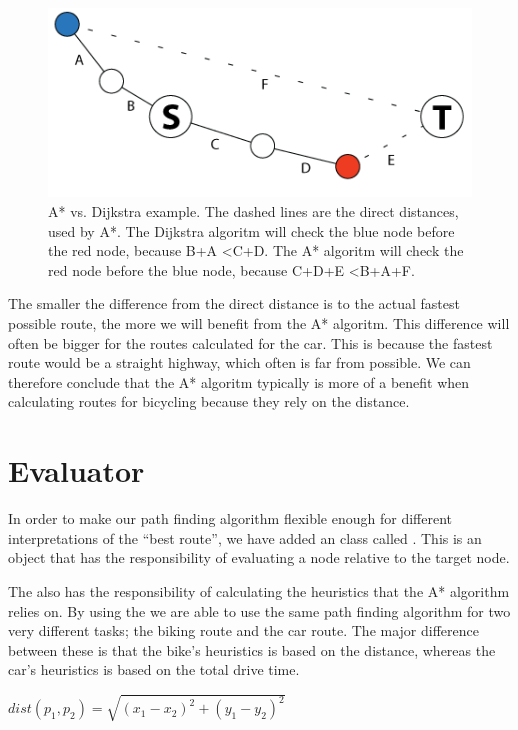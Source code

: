 \begin{figure}[!ht]
\centering
\includegraphics[width=1\linewidth]{images/AstarVSDijkstra.png}
\caption{A* vs. Dijkstra example. The dashed lines are the direct distances,
used by A*. The Dijkstra algoritm will check the blue node before the red
node, because B+A \textless C+D. The A* algoritm will check the red node
before the blue node, because C+D+E \textless B+A+F.}
\label{ad}
\end{figure}

The smaller the difference from the direct distance is to the actual fastest
possible route, the more we will benefit from the A* algoritm. This
difference will often be bigger for the routes calculated for the car. This is
because the fastest route would be a straight highway, which often is far from
possible. We can therefore conclude that the A* algoritm typically is more
of a benefit when calculating routes for bicycling because they rely on the
distance.

\section{Evaluator}
\label{IMPL-EVA}
In order to make our path finding algorithm flexible enough for different 
interpretations of the ``best route'', we have added an class called
. This is an object that has the responsibility of evaluating a node relative to 
the target node. 

The  also has the responsibility of calculating the 
heuristics that the A* algorithm relies on. By using the  we are able to 
use the same path finding algorithm for two very different tasks; the biking route and 
the car route. The major difference between these is that the bike's heuristics is based 
on the distance, whereas the car's heuristics is based on the total drive time. 

\begin{center}
$
dist(p_{1},p_{2})=\sqrt{(x_{1}-x_{2})^{2}+(y_{1}-y_{2})^{2}}
$
\end{center}

